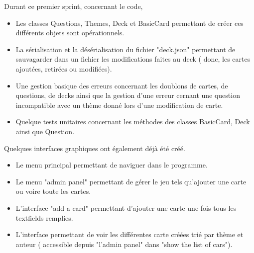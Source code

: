 Durant ce premier sprint, concernant le code,
\begin{itemize}
	\item Les classes Questions, Themes, Deck et BasicCard permettant de créer ces différents objets sont opérationnels.
	\item La sérialisation et la désérialisation du fichier "deck.json" permettant de sauvagarder dans un fichier les modifications faites au deck ( donc, les cartes ajoutées, retirées ou modifiées).
	\item Une gestion basique des erreurs concernant les doublons de cartes, de questions, de decks ainsi que la gestion d'une erreur cernant une question incompatible avec un thème donné lors d'une modification de carte. 
	\item Quelque tests unitaires concernant les méthodes des classes BasicCard, Deck ainsi que Question.
\end{itemize}

Quelques interfaces graphiques ont également déjà été créé. 
\begin{itemize}
	\item Le menu principal permettant de naviguer dans le programme.
	\item Le menu "admin panel" permettant de gérer le jeu tels qu'ajouter une carte ou voire toute les cartes.
	\item L'interface "add a card" permettant d'ajouter une carte une fois tous les textfields remplies.
	\item L'interface permettant de voir les différentes carte créées trié par thème et auteur ( accessible depuis "l'admin panel" dans "show the list of cars").
\end{itemize}
